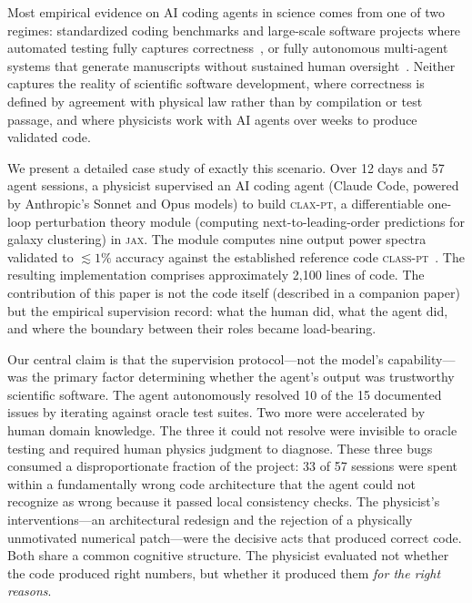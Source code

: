 \documentclass{article}
\newcommand{\claxpt}{\textsc{clax-pt}\xspace}
\newcommand{\classpt}{\textsc{class-pt}\xspace}
\newcommand{\jax}{\textsc{jax}\xspace}
\begin{document}
Most empirical evidence on AI coding agents in science comes from one of two regimes: standardized coding benchmarks and large-scale software projects where automated testing fully captures correctness~\citep{carlini2026}, or fully autonomous multi-agent systems that generate manuscripts without sustained human oversight~\citep{villaescusa2025}. Neither captures the reality of scientific software development, where correctness is defined by agreement with physical law rather than by compilation or test passage, and where physicists work with AI agents over weeks to produce validated code.

We present a detailed case study of exactly this scenario. Over 12 days and 57 agent sessions, a physicist supervised an AI coding agent (Claude Code, powered by Anthropic's Sonnet and Opus models) to build \claxpt, a differentiable one-loop perturbation theory module (computing next-to-leading-order predictions for galaxy clustering) in \jax. The module computes nine output power spectra validated to ${\lesssim}1\%$ accuracy against the established reference code \classpt~\citep{chudaykin2021}. The resulting implementation comprises approximately 2,100 lines of code. The contribution of this paper is not the code itself (described in a companion paper) but the empirical supervision record: what the human did, what the agent did, and where the boundary between their roles became load-bearing.

Our central claim is that the supervision protocol---not the model's capability---was the primary factor determining whether the agent's output was trustworthy scientific software. The agent autonomously resolved 10 of the 15 documented issues by iterating against oracle test suites. Two more were accelerated by human domain knowledge. The three it could not resolve were invisible to oracle testing and required human physics judgment to diagnose. These three bugs consumed a disproportionate fraction of the project: 33 of 57 sessions were spent within a fundamentally wrong code architecture that the agent could not recognize as wrong because it passed local consistency checks. The physicist's interventions---an architectural redesign and the rejection of a physically unmotivated numerical patch---were the decisive acts that produced correct code. Both share a common cognitive structure. The physicist evaluated not whether the code produced right numbers, but whether it produced them \emph{for the right reasons}.

\end{document}
